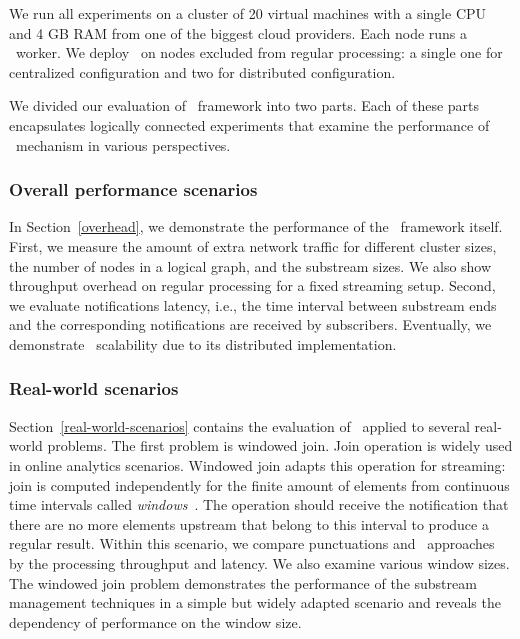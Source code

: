 We run all experiments on a cluster of 20 virtual machines with a single CPU and 4 GB RAM from one of the biggest cloud providers. Each node runs a \FlameStream\ worker. We deploy \tracker\ on nodes excluded from regular processing: a single one for centralized configuration and two for distributed configuration. 

We divided our evaluation of \tracker\ framework into two parts. Each of these parts encapsulates logically connected experiments that examine the performance of \tracker\ mechanism in various perspectives.

\subsubsection{Overall performance scenarios}

In Section~\ref{overhead}, we demonstrate the performance of the \tracker\ framework itself. First, we measure the amount of extra network traffic for different cluster sizes, the number of nodes in a logical graph, and the substream sizes. We also show throughput overhead on regular processing for a fixed streaming setup. Second, we evaluate notifications latency, i.e., the time interval between substream ends and the corresponding notifications are received by subscribers.  Eventually, we demonstrate \tracker\ scalability due to its distributed implementation. 

\subsubsection{Real-world scenarios}

Section~\ref{real-world-scenarios} contains the evaluation of \tracker\ applied to several real-world problems. The first problem is windowed join. Join operation is widely used in online analytics scenarios. Windowed join adapts this operation for streaming: join is computed independently for the finite amount of elements from continuous time intervals called {\em windows}~\cite{Begoli:2019:OSR:3299869.3314040}. The operation should receive the notification that there are no more elements upstream that belong to this interval to produce a regular result. Within this scenario, we compare punctuations and \tracker\ approaches by the processing throughput and latency. We also examine various window sizes. The windowed join problem demonstrates the performance of the substream management techniques in a simple but widely adapted scenario and reveals the dependency of performance on the window size.  

